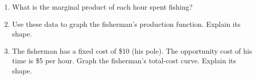 \documentclass{article}
\begin{document}
\begin{enumerate}
	\begin{enumerate}
	
	\item What is the marginal product of each hour spent fishing?
	
	\item Use these data to graph the fisherman's production function. Explain its shape.
	
	\item The fisherman has a fixed cost of \$10 (his pole). The opportunity cost of his time is \$5 per hour. Graph the fisherman's total-cost curve. Explain its shape.
	
	\end{enumerate}

\end{enumerate}
\end{document}
